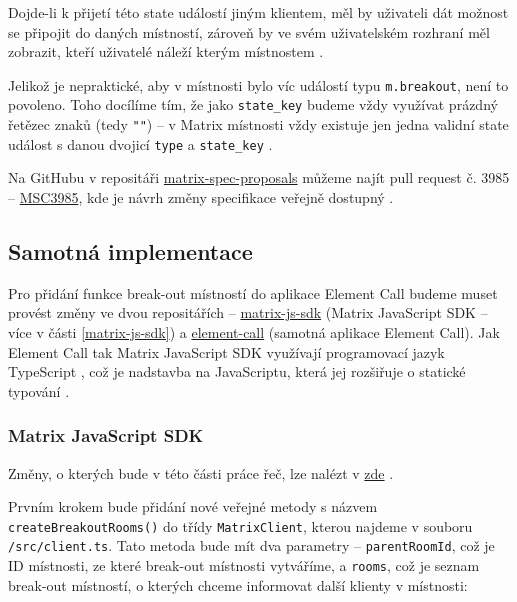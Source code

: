 Dojde-li k přijetí této state událostí jiným klientem, měl by uživateli dát
možnost se připojit do daných místností, zároveň by ve svém uživatelském
rozhraní měl zobrazit, kteří uživatelé náleží kterým místnostem
\parencite{GitHub-MSC3985}.

Jelikož je nepraktické, aby v místnosti bylo víc událostí typu
\texttt{m.breakout}, není to povoleno. Toho docílíme tím, že jako
\texttt{state_key} budeme vždy využívat prázdný řetězec znaků (tedy
\texttt{""}) \parencite{GitHub-MSC3985} -- v Matrix místnosti vždy
existuje jen jedna validní state událost s danou dvojicí \texttt{type}
a \texttt{state_key} \parencite{MatrixORG-Spec}.

Na GitHubu v repositáři
\href{https://github.com/matrix-org/matrix-spec-proposals}{matrix-spec-proposals}
můžeme najít pull request č. 3985 --
\href{https://github.com/matrix-org/matrix-spec-proposals/pull/3985}{MSC3985},
kde je návrh změny specifikace veřejně dostupný \parencite{GitHub-MSC3985}.

\subsection{Samotná implementace}

Pro přidání funkce break-out místností do aplikace Element Call budeme muset
provést změny ve dvou repositářích --
\href{https://github.com/matrix-org/matrix-js-sdk/}{matrix-js-sdk} (Matrix
JavaScript SDK -- více v části \ref{matrix-js-sdk}) a
\href{https://github.com/vector-im/element-call/}{element-call} (samotná
aplikace Element Call). Jak Element Call tak Matrix JavaScript SDK využívají
programovací jazyk TypeScript \parencite{GitHub-MatrixJSSDK,
    GitHub-ElementCall}, což je nadstavba na JavaScriptu, která jej rozšiřuje o
statické typování \parencite{TypeScript-Homepage}.

\subsubsection{Matrix JavaScript SDK}

Změny, o kterých bude v této části práce řeč, lze nalézt v
\href{https://github.com/matrix-org/matrix-js-sdk/pull/3753/}{zde}
\parencite{GitHub-MatrixJSSDK-BreakoutRooms}.

Prvním krokem bude přidání nové veřejné metody s názvem
\texttt{createBreakoutRooms()} do třídy
\texttt{MatrixClient}, kterou najdeme v souboru
\texttt{/src/client.ts}. Tato metoda bude mít dva parametry --
\texttt{parentRoomId}, což je ID místnosti, ze které break-out
místnosti vytváříme, a \texttt{rooms}, což je seznam break-out
místností, o kterých chceme informovat další klienty v místnosti:

